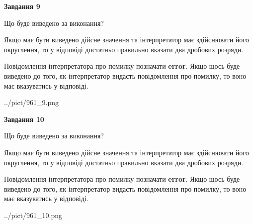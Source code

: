 \documentclass[12pt, ukrainian]{article}
\begin{document}
{\begin {Large}
{\begin {center}\textbf{Завдання 9}\end {center}}\par
Що буде виведено за виконання? \par

Якщо має бути виведено дійсне значення та інтерпретатор має здійснювати його округлення, 
то у відповіді достатньо правильно вказати два дробових розряди.

Повідомлення інтерпретатора про помилку позначати \textbf{error}.
Якщо щось буде виведено до того, як інтерпретатор видасть повідомлення про помилку, 
то воно має вказуватись у відповіді. \par

\begin{center}
	{../pict/961_9.png}
\end{center}
\newpage

{\begin {center}\textbf{Завдання 10}\end {center}}\par
Що буде виведено за виконання? \par

Якщо має бути виведено дійсне значення та інтерпретатор має здійснювати його округлення, 
то у відповіді достатньо правильно вказати два дробових розряди.

Повідомлення інтерпретатора про помилку позначати \textbf{error}.
Якщо щось буде виведено до того, як інтерпретатор видасть повідомлення про помилку, 
то воно має вказуватись у відповіді. \par

\begin{center}
	{../pict/961_10.png}
\end{center}
\newpage

\end {Large}}
\end{document}
